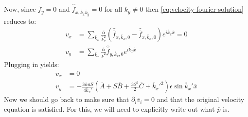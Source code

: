 \documentclass[reqno]{article}
\begin{document}
	Now, since $\overline{f}_y = 0$ and $\hat{\overline{f}}_{x, \overline{k}_x \overline{k}_y} = 0$ for all $\overline{k}_y \neq 0$ then \eqref{eq:velocity-fourier-solution} reduces to:
	\begin{equation}
	\begin{split}
	v_x 
	&= \sum_{\overline{k}_x}
	\frac{\overline{\alpha}}{\overline{k}_x^2}
	\left(
	\hat{\overline{f}}_{x, \overline{k}_x, 0}
	- \hat{\overline{f}}_{x, \overline{k}_x, 0}
	\right)
	e^{i \overline{k}_x \overline{x}}
	= 0 \\
	v_y
	&= \sum_{\overline{k}_x}
	\frac{\overline{\alpha}}{\overline{k}^2}
	\hat{\overline{f}}_{y, \overline{k}_x, 0} 
	e^{i \overline{k}_x \overline{x}}
	\end{split}
	\end{equation}
	Plugging in yields:
	\begin{equation}
	\begin{split}
	v_x
	&= 0 \\
	v_y
	&= -\frac{3 \overline{\alpha} a S}{4 \overline{k}_x'}
	\left(
	\overline{A}
	+ S \overline{B}
	+ \frac{3 S^2}{2} \overline{C}
	+ \overline{k}_x'^2
	\right)
	\epsilon \sin \overline{k}_x' \overline{x}
	\end{split}
	\end{equation}
	Now we should go back to make sure that $\partial_i \overline{v}_i = 0$ and that the original velocity equation is satisfied. For this, we will need to explicitly write out what $\overline{p}$ is. 
	
\end{document}
